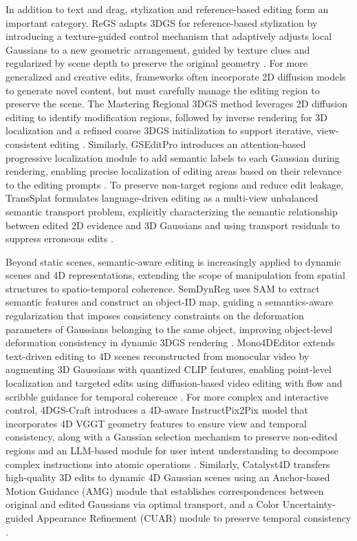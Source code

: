 \documentclass[11pt]{article}
\begin{document}
In addition to text and drag, stylization and reference-based editing form an important category. ReGS adapts 3DGS for reference-based stylization by introducing a texture-guided control mechanism that adaptively adjusts local Gaussians to a new geometric arrangement, guided by texture clues and regularized by scene depth to preserve the original geometry \cite{ref552}. For more generalized and creative edits, frameworks often incorporate 2D diffusion models to generate novel content, but must carefully manage the editing region to preserve the scene. The Mastering Regional 3DGS method leverages 2D diffusion editing to identify modification regions, followed by inverse rendering for 3D localization and a refined coarse 3DGS initialization to support iterative, view-consistent editing \cite{ref553}. Similarly, GSEditPro introduces an attention-based progressive localization module to add semantic labels to each Gaussian during rendering, enabling precise localization of editing areas based on their relevance to the editing prompts \cite{ref554}. To preserve non-target regions and reduce edit leakage, TransSplat formulates language-driven editing as a multi-view unbalanced semantic transport problem, explicitly characterizing the semantic relationship between edited 2D evidence and 3D Gaussians and using transport residuals to suppress erroneous edits \cite{ref555}.

Beyond static scenes, semantic-aware editing is increasingly applied to dynamic scenes and 4D representations, extending the scope of manipulation from spatial structures to spatio-temporal coherence. SemDynReg uses SAM to extract semantic features and construct an object-ID map, guiding a semantics-aware regularization that imposes consistency constraints on the deformation parameters of Gaussians belonging to the same object, improving object-level deformation consistency in dynamic 3DGS rendering \cite{ref556}. Mono4DEditor extends text-driven editing to 4D scenes reconstructed from monocular video by augmenting 3D Gaussians with quantized CLIP features, enabling point-level localization and targeted edits using diffusion-based video editing with flow and scribble guidance for temporal coherence \cite{ref557}. For more complex and interactive control, 4DGS-Craft introduces a 4D-aware InstructPix2Pix model that incorporates 4D VGGT geometry features to ensure view and temporal consistency, along with a Gaussian selection mechanism to preserve non-edited regions and an LLM-based module for user intent understanding to decompose complex instructions into atomic operations \cite{ref558}. Similarly, Catalyst4D transfers high-quality 3D edits to dynamic 4D Gaussian scenes using an Anchor-based Motion Guidance (AMG) module that establishes correspondences between original and edited Gaussians via optimal transport, and a Color Uncertainty-guided Appearance Refinement (CUAR) module to preserve temporal consistency \cite{ref559}.
\end{document}
